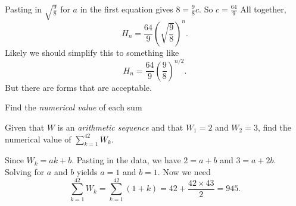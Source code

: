 \documentclass[12pt,fleqn,answers]{exam}
\begin{document}
\begin{questions}
\begin{solution}[2.25in]
 Pasting  in $\sqrt{\frac{9}{8}}$ for $a$ in
 the first equation gives $8= \frac{9}{8} c $. So $c = \frac{64}{9}$ All together,
 \begin{equation*}
     H_n =  \frac{64}{9} \left(\sqrt{\frac{9}{8}}\right)^n.
 \end{equation*}
 Likely we should simplify this to something like
 \begin{equation*}
  H_n =  \frac{64}{9} \left(\frac{9}{8}\right)^{n/2}.
\end{equation*}
But there are forms that are acceptable.
\end{solution}

\question Find the \emph{numerical value} of each sum

\question Given that $W$ is an \emph{arithmetic sequence} and that $W_1=2$ and $W_2 = 3$,
find the numerical value of $\displaystyle \sum_{k=1}^{42} W_k$. 

\begin{solution}%

  Since $W_k = a k + b$.  Pasting in the data, we have $2 = a + b$ and $3 = a + 2 b$. 
  Solving for $a$ and $b$ yields $a=1$ and $b=1$.  Now we need
  \begin{equation*}
    \sum_{k=1}^{42} W_k = \sum_{k=1}^{42} (1+k) = 42 + \frac{42 \times 43}{2} = 945.
  \end{equation*}


\end{solution}
\end{questions}
\end{document}
